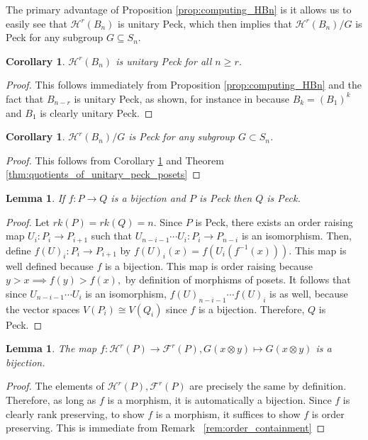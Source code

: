 \documentclass{amsart}
\newtheorem{cor}[thm]{Corollary}
\newtheorem{lem}[thm]{Lemma}
\theoremstyle{remark}
\begin{document}
The primary advantage of Proposition \ref{prop:computing_HBn} is it allows us to easily see that $\mathcal{H}^r(B_n)$ is unitary Peck, which then implies that $\mathcal{H}^r(B_n)/G$ is Peck for any subgroup $G\subseteq S_n$.


\begin{cor}\label{cor:HBn_unitary_peck}
$\mathcal{H}^r(B_n)$ is unitary Peck for all $n\ge r$.
\end{cor}

\begin{proof}
This follows immediately from Proposition \ref{prop:computing_HBn} and the fact that $B_{n-r}$ is unitary Peck, as shown, for instance in \cite[Theorem 2a]{quotients_stanley} because $B_k = (B_1)^k$ and $B_1$ is clearly unitary Peck.
\end{proof}

\begin{cor}\label{cor:quotients_of_HBn_peck}
$\mathcal{H}^r(B_n)/G$ is Peck for any subgroup $G\subset S_n$.
\end{cor}

\begin{proof}
This follows from Corollary \ref{cor:HBn_unitary_peck} and Theorem \ref{thm:quotients_of_unitary_peck_posets}
\end{proof}

\begin{lem}
\label{lem:bijection_peck_implication}
If $f:P\rightarrow Q$ is a bijection and $P$ is Peck then $Q$ is Peck.
\end{lem}
\begin{proof}
Let $rk(P) = rk(Q) = n.$ Since $P$ is Peck, there exists an order raising map $U_i:P_i\rightarrow P_{i+1}$ such that $U_{n-i-1} \cdots U_i:P_i \rightarrow P_{n-i}$ is an isomorphism. Then, define $f(U)_i:P_i\rightarrow P_{i+1}$ by $f(U)_i(x) = f(U_i(f^{-1}(x))).$ This map is well defined because $f$ is a bijection. This map is order raising because $y > x \implies f(y) > f(x),$ by definition of morphisms of posets. It follows that since $U_{n-i-1} \cdots U_i$ is an isomorphism, $f(U)_{n-i-1} \cdots f(U)_i$ is as well, because the vector spaces $V(P_i) \cong V(Q_i)$ since $f$ is a bijection. Therefore, $Q$ is Peck.
\end{proof}

\begin{lem}
\label{bijection_h_f}
The map $f:\mathcal H^r(P) \rightarrow \mathcal F^r(P),G(x\otimes y) \mapsto G(x\otimes y)$ is a bijection.
\end{lem}
\begin{proof}
The elements of $\mathcal H^r(P),\mathcal F^r(P)$ are precisely the same by definition. Therefore, as long as $f$ is a morphism, it is automatically a bijection. Since $f$ is clearly rank preserving, to show $f$ is a morphism, it suffices to show $f$ is order preserving. This is immediate from Remark ~\ref{rem:order_containment}
\end{proof}
\end{document}

